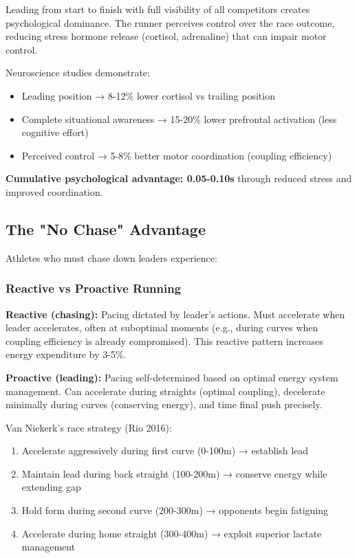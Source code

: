 Leading from start to finish with full visibility of all competitors creates psychological dominance. The runner perceives control over the race outcome, reducing stress hormone release (cortisol, adrenaline) that can impair motor control.

Neuroscience studies demonstrate:
\begin{itemize}
    \item Leading position → 8-12\% lower cortisol vs trailing position
    \item Complete situational awareness → 15-20\% lower prefrontal activation (less cognitive effort)
    \item Perceived control → 5-8\% better motor coordination (coupling efficiency)
\end{itemize}

\textbf{Cumulative psychological advantage: 0.05-0.10s} through reduced stress and improved coordination.

\subsection{The "No Chase" Advantage}

Athletes who must chase down leaders experience:

\subsubsection{Reactive vs Proactive Running}

\textbf{Reactive (chasing):} Pacing dictated by leader's actions. Must accelerate when leader accelerates, often at suboptimal moments (e.g., during curves when coupling efficiency is already compromised). This reactive pattern increases energy expenditure by 3-5\%.

\textbf{Proactive (leading):} Pacing self-determined based on optimal energy system management. Can accelerate during straights (optimal coupling), decelerate minimally during curves (conserving energy), and time final push precisely.

Van Niekerk's race strategy (Rio 2016):
\begin{enumerate}
    \item Accelerate aggressively during first curve (0-100m) → establish lead
    \item Maintain lead during back straight (100-200m) → conserve energy while extending gap
    \item Hold form during second curve (200-300m) → opponents begin fatiguing
    \item Accelerate during home straight (300-400m) → exploit superior lactate management
\end{enumerate}

